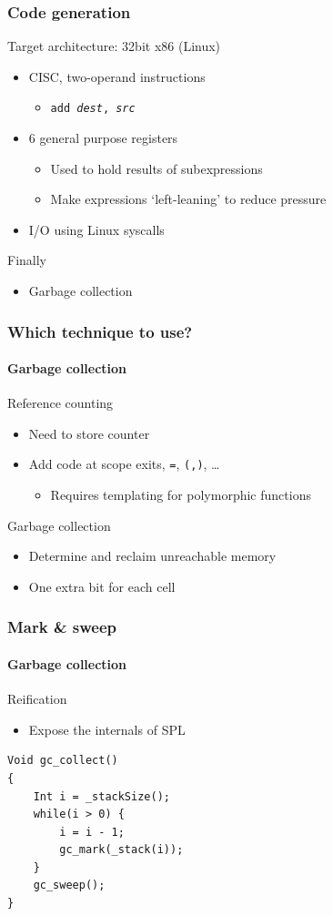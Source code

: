 \documentclass{beamer}
\begin{document}
\begin{frame}
\frametitle{Code generation}
Target architecture: 32bit x86 (Linux)
\begin{itemize}
\item CISC, two-operand instructions
\begin{itemize}
\item \texttt{add \emph{dest}, \emph{src}} 
\end{itemize}
\item 6 general purpose registers
\begin{itemize}
\item Used to hold results of subexpressions
\item Make expressions `left-leaning' to reduce pressure
\end{itemize}
\item I/O using Linux syscalls
\end{itemize}
\end{frame}

\begin{frame}
\begin{block}{Finally}
\begin{itemize}
\item Garbage collection
\end{itemize}
\end{block}
\end{frame}

\begin{frame}
\frametitle{Which technique to use?}
\framesubtitle{Garbage collection}
Reference counting
\begin{itemize}
\item Need to store counter
\item Add code at scope exits, \texttt{=}, \texttt{(,)}, \ldots
\begin{itemize}
\item Requires templating for polymorphic functions
\end{itemize}
\end{itemize}
Garbage collection
\begin{itemize}
\item Determine and reclaim unreachable memory
\item One extra bit for each cell
\end{itemize}
\end{frame}

\begin{frame}[fragile]
\frametitle{Mark \& sweep}
\framesubtitle{Garbage collection}
Reification
\begin{itemize}
\item Expose the internals of SPL
\end{itemize}
\begin{code}
\begin{lstlisting}
Void gc_collect()
{
    Int i = _stackSize();
    while(i > 0) {
        i = i - 1;
        gc_mark(_stack(i));
    }
    gc_sweep();
}
\end{lstlisting}
\end{code}
\end{frame}
\end{document}

